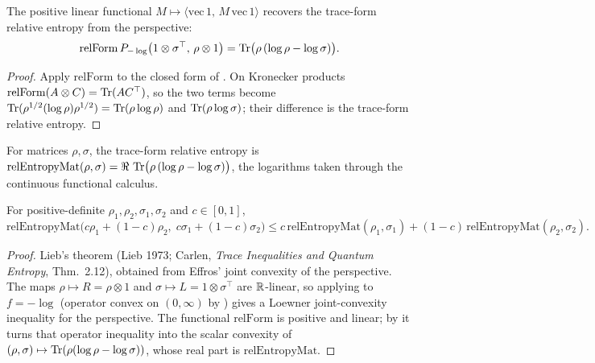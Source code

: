 \begin{lemma}\label{relForm_opPersp_neg_log}
  \leanok
  The positive linear functional \(M\mapsto\langle\mathrm{vec}\,1,\,M\,\mathrm{vec}\,1\rangle\)
  recovers the trace-form relative entropy from the perspective:
  \[
    \mathrm{relForm}\,P_{-\log}\bigl(1\otimes\sigma^{\top},\,\rho\otimes 1\bigr)
      = \operatorname{Tr}\bigl(\rho\,(\log\rho - \log\sigma)\bigr).
  \]
\end{lemma}
\begin{proof}\leanok
  Apply \(\mathrm{relForm}\) to the closed form of . On Kronecker
  products \(\mathrm{relForm}(A\otimes C) = \operatorname{Tr}(AC^{\top})\), so the two terms become
  \(\operatorname{Tr}(\rho^{1/2}(\log\rho)\rho^{1/2}) = \operatorname{Tr}(\rho\log\rho)\) and \(\operatorname{Tr}(\rho\log\sigma)\); their
  difference is the trace-form relative entropy.
\end{proof}

\begin{definition}\label{relEntropyMat}
  \leanok
  For matrices \(\rho,\sigma\), the trace-form relative entropy is
  \(\mathrm{relEntropyMat}(\rho,\sigma) = \Re\,\operatorname{Tr}\bigl(\rho\,(\log\rho - \log\sigma)\bigr)\), the
  logarithms taken through the continuous functional calculus.
\end{definition}

\begin{theorem}\label{relEntropyMat_jointly_convex}
  \leanok
  For positive-definite \(\rho_1,\rho_2,\sigma_1,\sigma_2\) and \(c\in[0,1]\),
  \[
    \mathrm{relEntropyMat}\bigl(c\rho_1 + (1-c)\rho_2,\;c\sigma_1 + (1-c)\sigma_2\bigr)
      \le c\,\mathrm{relEntropyMat}(\rho_1,\sigma_1) + (1-c)\,\mathrm{relEntropyMat}(\rho_2,\sigma_2).
  \]
\end{theorem}
\begin{proof}\leanok
  Lieb's theorem (Lieb 1973; Carlen, \emph{Trace Inequalities and Quantum Entropy}, Thm.~2.12), obtained from
  Effros' joint convexity of the perspective. The maps \(\rho\mapsto R = \rho\otimes 1\) and
  \(\sigma\mapsto L = 1\otimes\sigma^{\top}\) are \(\mathbb{R}\)-linear, so applying
   to \(f = -\log\) (operator convex on \((0,\infty)\) by
  ) gives a Loewner joint-convexity inequality for the perspective.
  The functional \(\mathrm{relForm}\) is positive and linear; by  it
  turns that operator inequality into the scalar convexity of
  \((\rho,\sigma)\mapsto\operatorname{Tr}(\rho(\log\rho - \log\sigma))\), whose real part is
  \(\mathrm{relEntropyMat}\).
\end{proof}

